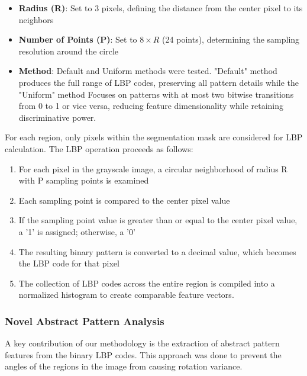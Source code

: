 \documentclass[a4paper,12pt]{report}
\begin{document}
\begin{itemize}
    \item \textbf{Radius (R)}: Set to 3 pixels, defining the distance from the center pixel to its neighbors
    \item \textbf{Number of Points (P)}: Set to $8 \times R$ (24 points), determining the sampling resolution around the circle
    \item \textbf{Method}: Default and Uniform methods were tested. "Default" method produces the full range of LBP codes, preserving all pattern details while the "Uniform" method Focuses on patterns with at most two bitwise transitions from 0 to 1 or vice versa, reducing feature dimensionality while retaining discriminative power.
\end{itemize}

For each region, only pixels within the segmentation mask are considered for LBP calculation. The LBP operation proceeds as follows:

\begin{enumerate}
    \item For each pixel in the grayscale image, a circular neighborhood of radius R with P sampling points is examined
    \item Each sampling point is compared to the center pixel value
    \item If the sampling point value is greater than or equal to the center pixel value, a '1' is assigned; otherwise, a '0'
    \item The resulting binary pattern is converted to a decimal value, which becomes the LBP code for that pixel
    \item The collection of LBP codes across the entire region is compiled into a normalized histogram to create comparable feature vectors.
\end{enumerate}

\subsubsection{Novel Abstract Pattern Analysis}

A key contribution of our methodology is the extraction of abstract pattern features from the binary LBP codes. This approach was done to prevent the angles of the regions in the image from causing rotation variance.
\end{document}
